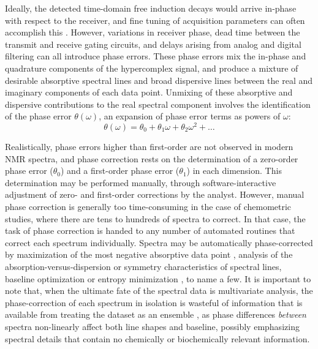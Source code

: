 \begin{doublespace}
Ideally, the detected time-domain free induction decays would arrive in-phase
with respect to the receiver, and fine tuning of acquisition parameters can
often accomplish this \cite{chylla:jbnmr1998}.
However, variations in receiver phase, dead time
between the transmit and receive gating circuits, and delays arising from
analog and digital filtering can all introduce phase errors. These phase
errors mix the in-phase and quadrature components of the hypercomplex signal,
and produce a mixture of desirable absorptive spectral lines and broad
dispersive lines between the real and imaginary components of each data point.
Unmixing of these absorptive and dispersive contributions to the real spectral
component involves the identification of the phase error $\theta(\omega)$, an
expansion of phase error terms as powers of $\omega$:
\begin{equation}
\theta(\omega) = \theta_0 + \theta_1 \omega + \theta_2 \omega^2 + \dots
\end{equation}

Realistically, phase errors higher than first-order are not observed in modern
NMR spectra, and phase correction rests on the determination of a zero-order
phase error ($\theta_0$) and a first-order phase error ($\theta_1$) in each
dimension. This determination may be performed manually, through
software-interactive adjustment of zero- and first-order corrections by the
analyst. However, manual phase correction is generally too time-consuming in
the case of chemometric studies, where there are tens to hundreds of spectra
to correct. In that case, the task of phase correction is handed to any number
of automated routines that correct each spectrum individually. Spectra may be
automatically phase-corrected by maximization of the most negative absorptive
data point \cite{siegel:aca1981}, analysis of the absorption-versus-dispersion
\cite{craig:jmr1988} or symmetry \cite{heuer:jmr1991} characteristics of
spectral lines, baseline optimization \cite{brown:jmr1989} or entropy
minimization \cite{chen:jmr2002}, to name a few. It is important to note that,
when the ultimate fate of the spectral data is multivariate analysis, the
phase-correction of each spectrum in isolation is wasteful of information that
is available from treating the dataset as an ensemble \cite{worley:cils2014},
as phase differences {\it between} spectra non-linearly affect both line shapes
and baseline, possibly emphasizing spectral details that contain no
chemically or biochemically relevant information.
\end{doublespace}

